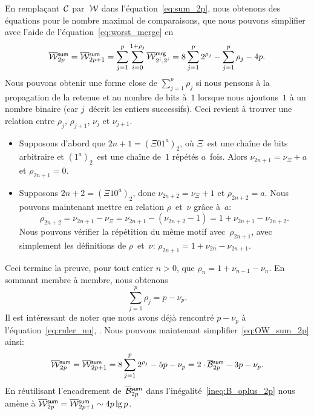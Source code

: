 En remplaçant~\(\mathcal{C}\) par~\(\mathcal{W}\) dans
l'équation~\eqref{eq:sum_2p}, nous obtenons des équations pour le
nombre maximal de comparaisons, que nous pouvons simplifier avec
l'aide de l'équation~\eqref{eq:worst_merge} 
en
\begin{equation}
\OW{\fun{sum}}{2p}
  = \OW{\fun{sum}}{2p+1}
  = \sum_{j=1}^{p}\sum_{i=0}^{1+\rho_{j}}{\OW{\fun{mrg}}{2^i,2^i}}
  = 8\sum_{j=1}^{p}{2^{\rho_j}} - \sum_{j=1}^{p}\rho_j - 4p.
\label{eq:OW_sum_2p}
\index{sum@$\OW{\fun{sum}}{n}$}
\end{equation}
Nous pouvons obtenir une forme close de
\(\sum_{j=1}^{p}\rho_j\) si nous pensons à la propagation de la
retenue et au nombre de bits à~\(1\) lorsque nous ajoutons~\(1\) à un
nombre binaire (car \(j\)~décrit les entiers successifs). Ceci revient
à trouver une relation entre \(\rho_j\), \(\rho_{j+1}\), \(\nu_j\) et
\(\nu_{j+1}\).
\begin{itemize}

  \item Supposons d'abord que \(2n+1 = (\Xi 01^a)_2\), où \(\Xi\)~est
    une chaîne de bits arbitraire et \((1^a)_2\)~est une chaîne
    de~\(1\) répétés \(a\)~fois. Alors \(\nu_{2n+1} = \nu_{\Xi} + a\)
    et \(\rho_{2n+1} = 0\).

  \item Supposons \(2n+2 = (\Xi 10^a)_2\), donc \(\nu_{2n+2} =
    \nu_{\Xi} + 1\) et \(\rho_{2n+2} = a\). Nous pouvons maintenant
    mettre en relation \(\rho\)~et~\(\nu\) grâce à~\(a\):
    \begin{equation*}
      \rho_{2n+2} = \nu_{2n+1} - \nu_{\Xi} = \nu_{2n+1} - (\nu_{2n+2} - 1)
      = 1 + \nu_{2n+1} - \nu_{2n+2}.
    \end{equation*}
    Nous pouvons vérifier la répétition du même motif
    avec~\(\rho_{2n+1}\), avec simplement les définitions de
    \(\rho\)~et~\(\nu\): \(\rho_{2n+1} = 1 + \nu_{2n} - \nu_{2n+1}\).

\end{itemize}
Ceci termine la preuve, pour tout entier \(n>0\), que \(\rho_n = 1 +
\nu_{n-1} - \nu_{n}\). En sommant membre à membre, nous obtenons
\begin{equation*}
\sum_{j=1}^{p}{\rho_j} = p - \nu_p.
\end{equation*}
Il est intéressant de noter que nous avons déjà rencontré \(p -
\nu_p\)  à l'équation~\eqref{eq:ruler_nu},
. Nous pouvons maintenant
simplifier~\eqref{eq:OW_sum_2p} ainsi:
\begin{equation*}
\OW{\fun{sum}}{2p}
 = \OW{\fun{sum}}{2p+1}
 = 8\sum_{j=1}^{p}{2^{\rho_j}} - 5p - \nu_p
 = 2 \cdot \OB{\fun{sum}}{2p} - 3p - \nu_p.
\index{sum@$\OW{\fun{sum}}{n}$}
\end{equation*}
En réutilisant l'encadrement de~\(\OB{\fun{sum}}{2p}\) dans
l'inégalité~\eqref{ineq:B_oplus_2p} nous amène à \(\OW{\fun{sum}}{2p}
= \OW{\fun{sum}}{2p+1} \sim 4p\lg p\).

